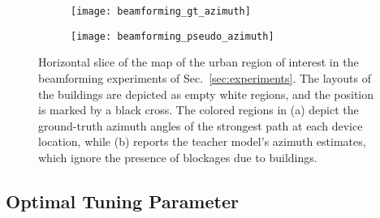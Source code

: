 \documentclass[journal]{IEEEtran}
\begin{document}
\begin{figure}
    \centering
    \begin{subfigure}{0.43\columnwidth}
        \centering
        \texttt{[image: beamforming\_gt\_azimuth]}
        \vspace{-0.08in}
        \caption{\hspace*{-0.25in}}
        \label{subfig:beamforming_gt_az}
    \end{subfigure}
    \hfill
    \begin{subfigure}{0.55\columnwidth}
        \centering
        \texttt{[image: beamforming\_pseudo\_azimuth]}
        \vspace{-0.08in}
        \caption{\hspace*{0.1in}}
        \label{subfig:beamforming_pseudo_az}
    \end{subfigure}
    \vspace{-0.2in}
    \caption{
    Horizontal slice of the map of the urban region of interest in the beamforming experiments of Sec.~\ref{sec:experiments}.
    The layouts of the buildings are depicted as empty white regions, and the  position is marked by a black cross.
    The colored regions in (a) depict the ground-truth azimuth angles of the strongest path at each device location, while (b) reports the teacher model's azimuth estimates, which ignore the presence of  blockages due to buildings.
    }
    \label{fig:bearmforming_setup}
\end{figure}

\subsection{Optimal Tuning Parameter} \label{subsec:optimal_tuning}
\end{document}
